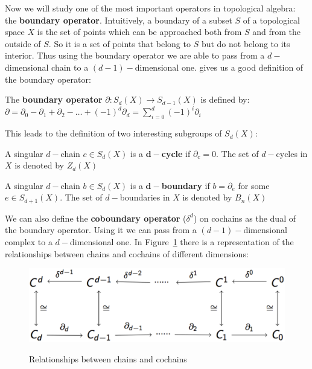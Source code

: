 Now we will study one of the most important operators in topological algebra: the \textbf{boundary operator}. Intuitively, a boundary of a subset $S$ of a topological space $X$ is the set of points which can be approached both from $S$ and from the outside of $S$. So it is a set of points that belong to $S$ but do not belong to its interior. Thus using the boundary operator we are able to pass from a $d-$dimensional chain to a $(d-1)-$dimensional one. \cite{Kosniowski} gives us a good definition of the boundary operator:

\begin{definition}
 The \textbf{boundary operator} $\partial \colon S_{d}(X) \rightarrow S_{d-1}(X)$ is defined by:\\
 $\partial = \partial_{0} - \partial_{1} + \partial_{2} - \dots + (-1)^{d}\partial_{d} = \displaystyle\sum_{i=0}^{d} (-1)^i\partial_{i}$
\end{definition}

This leads to the definition of two interesting subgroups of $S_{d}(X)$:

\begin{definition}[Cycles]
 A singular $d-$chain $c \in S_{d}(X)$ is a \textbf{$\mathbf{d-}$cycle} if $\partial_{c} = 0$. The set of $d-$cycles in $X$ is denoted by $Z_{d}(X)$
\end{definition}
 
\begin{definition}[d-boundaries]
 A singular $d-$chain $b \in S_{d}(X)$ is a \textbf{$\mathbf{d-}$boundary} if $b = \partial_{e}$ for some $e \in S_{d+1}(X)$. The set of $d-$boundaries in $X$ is denoted by $B_{n}(X)$
\end{definition}

We can also define the \textbf{coboundary operator} ($\delta^{d}$) on cochains as the dual of the boundary operator. Using it we can pass from a $(d-1)-$dimensional complex to a $d-$dimensional one. In Figure~\ref{fig:larComplexMap} there is a representation of the relationships between chains and cochains of different dimensions:

\begin{figure}[htb] %
   \centering
   \includegraphics[width=0.75\linewidth]{images/chainComplexMap.png}\\
   \caption[Relationships between chains and cochains]{Relationships between chains and cochains}
   \label{fig:larComplexMap}
\end{figure}

